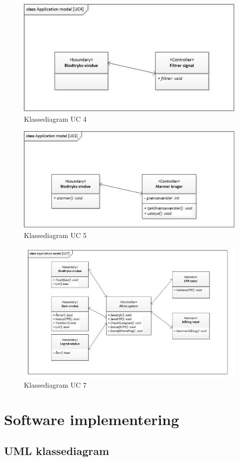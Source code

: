 \begin{figure}[H]
	\centering
	\includegraphics[width=1\textwidth]{Figurer/ISE/classAppModelUC4}
	\caption{Klassediagram UC 4}
	\label{classApp UC4}
\end{figure}

\begin{figure}[H]
	\centering
	\includegraphics[width=1\textwidth]{Figurer/ISE/classAppModelUC5}
	\caption{Klassediagram UC 5}
	\label{classApp UC5}
\end{figure}

\begin{figure}[H]
	\centering
	\includegraphics[width=1\textwidth]{Figurer/ISE/classAppModelUC7}
	\caption{Klassediagram UC 7}
	\label{classApp UC7}
\end{figure}

\section{Software implementering}\label{implementering}

\subsection{UML klassediagram}\label{UML klassediagram}


 








